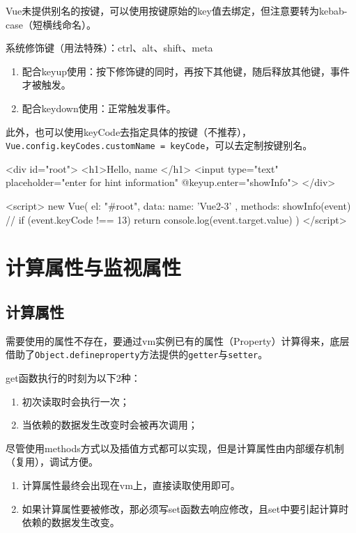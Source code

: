 Vue未提供别名的按键，可以使用按键原始的key值去绑定，但注意要转为kebab-case（短横线命名）。

系统修饰键（用法特殊）：ctrl、alt、shift、meta
\begin{enumerate}
    \item 配合keyup使用：按下修饰键的同时，再按下其他键，随后释放其他键，事件才被触发。
    \item 配合keydown使用：正常触发事件。
\end{enumerate}

此外，也可以使用keyCode去指定具体的按键（不推荐），\verb|Vue.config.keyCodes.customName = keyCode|，可以去定制按键别名。

\begin{html}
<div id="root">
    <h1>Hello, {{ name }}</h1>
    <input type="text" placeholder="enter for hint information" @keyup.enter="showInfo">
</div>
\end{html}

\begin{html}
<script>
    new Vue({
        el: "#root",
        data: {
            name: 'Vue2-3'
        },
        methods: {
            showInfo(event) {
                // if (event.keyCode !== 13) return
                console.log(event.target.value)
            }
        }
    })
</script>
\end{html}
\section{计算属性与监视属性}
\subsection{计算属性}
需要使用的属性不存在，要通过vm实例已有的属性（Property）计算得来，底层借助了\verb|Object.defineproperty|方法提供的\verb|getter|与\verb|setter|。

get函数执行的时刻为以下2种：
\begin{enumerate}
    \item 初次读取时会执行一次；
    \item 当依赖的数据发生改变时会被再次调用；
\end{enumerate}

尽管使用methods方式以及插值方式都可以实现，但是计算属性由内部缓存机制（复用），调试方便。

\begin{enumerate}
    \item 计算属性最终会出现在vm上，直接读取使用即可。
    \item 如果计算属性要被修改，那必须写set函数去响应修改，且set中要引起计算时依赖的数据发生改变。
\end{enumerate}

